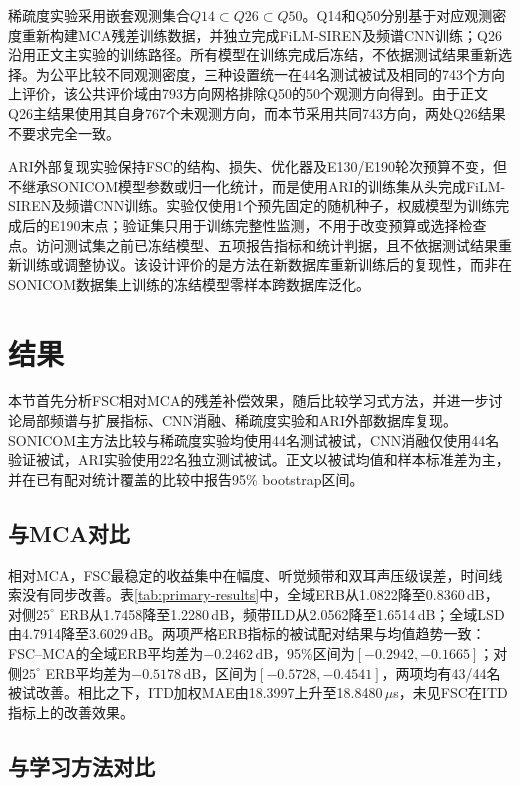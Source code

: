 \documentclass[UTF8,a4paper]{article}
\begin{document}
稀疏度实验采用嵌套观测集合$Q14\subset Q26\subset Q50$。Q14和Q50分别基于对应观测密度重新构建MCA残差训练数据，并独立完成FiLM-SIREN及频谱CNN训练；Q26沿用正文主实验的训练路径。所有模型在训练完成后冻结，不依据测试结果重新选择。为公平比较不同观测密度，三种设置统一在44名测试被试及相同的743个方向上评价，该公共评价域由793方向网格排除Q50的50个观测方向得到。由于正文Q26主结果使用其自身767个未观测方向，而本节采用共同743方向，两处Q26结果不要求完全一致。

ARI外部复现实验保持FSC的结构、损失、优化器及E130/E190轮次预算不变，但不继承SONICOM模型参数或归一化统计，而是使用ARI的训练集从头完成FiLM-SIREN及频谱CNN训练。实验仅使用1个预先固定的随机种子，权威模型为训练完成后的E190末点；验证集只用于训练完整性监测，不用于改变预算或选择检查点。访问测试集之前已冻结模型、五项报告指标和统计判据，且不依据测试结果重新训练或调整协议。该设计评价的是方法在新数据库重新训练后的复现性，而非在SONICOM数据集上训练的冻结模型零样本跨数据库泛化。

\section{结果}
\label{sec:results}

本节首先分析FSC相对MCA的残差补偿效果，随后比较学习式方法，并进一步讨论局部频谱与扩展指标、CNN消融、稀疏度实验和ARI外部数据库复现。SONICOM主方法比较与稀疏度实验均使用44名测试被试，CNN消融仅使用44名验证被试，ARI实验使用22名独立测试被试。正文以被试均值和样本标准差为主，并在已有配对统计覆盖的比较中报告95\% bootstrap区间。

\subsection{与MCA对比}
相对MCA，FSC最稳定的收益集中在幅度、听觉频带和双耳声压级误差，时间线索没有同步改善。表\ref{tab:primary-results}中，全域ERB从1.0822降至0.8360\,dB，对侧$25^\circ$ ERB从1.7458降至1.2280\,dB，频带ILD从2.0562降至1.6514\,dB；全域LSD由4.7914降至3.6029\,dB。两项严格ERB指标的被试配对结果与均值趋势一致：FSC--MCA的全域ERB平均差为$-0.2462$\,dB，95\%区间为$[-0.2942,-0.1665]$；对侧$25^\circ$ ERB平均差为$-0.5178$\,dB，区间为$[-0.5728,-0.4541]$，两项均有43/44名被试改善。相比之下，ITD加权MAE由18.3997上升至18.8480\,$\mu$s，未见FSC在ITD指标上的改善效果。



\subsection{与学习方法对比}
\end{document}

